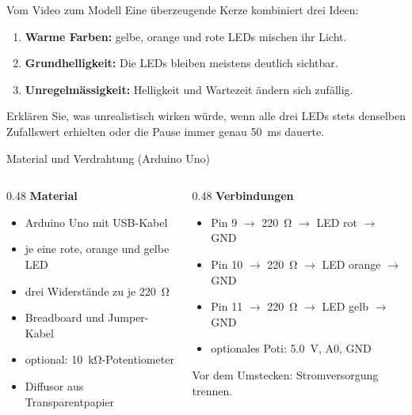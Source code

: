 \begin{frame}{Vom Video zum Modell}
	Eine überzeugende Kerze kombiniert drei Ideen:
	\begin{enumerate}[<+->]
		\item \textbf{Warme Farben:} gelbe, orange und rote LEDs mischen ihr Licht.
		\item \textbf{Grundhelligkeit:} Die LEDs bleiben meistens deutlich sichtbar.
		\item \textbf{Unregelmässigkeit:} Helligkeit und Wartezeit ändern sich zufällig.
	\end{enumerate}
	\pause
	\begin{myexercise}
		Erklären Sie, was unrealistisch wirken würde, wenn alle drei LEDs stets denselben
		Zufallswert erhielten oder die Pause immer genau \qty{50}{\milli\second} dauerte.
	\end{myexercise}
\end{frame}

\begin{frame}{Material und Verdrahtung (Arduino Uno)}
	\begin{columns}[T]
		\begin{column}{0.48\textwidth}
			\textbf{Material}
			\begin{itemize}
				\item Arduino Uno mit USB-Kabel
				\item je eine rote, orange und gelbe LED
				\item drei Widerstände zu je \qty{220}{\ohm}
				\item Breadboard und Jumper-Kabel
				\item optional: \qty{10}{\kilo\ohm}-Potentiometer
				\item Diffusor aus Transparentpapier
			\end{itemize}
		\end{column}
		\begin{column}{0.48\textwidth}
			\textbf{Verbindungen}
			\begin{itemize}
				\item Pin 9 $\rightarrow$ \qty{220}{\ohm} $\rightarrow$ LED rot $\rightarrow$ GND
				\item Pin 10 $\rightarrow$ \qty{220}{\ohm} $\rightarrow$ LED orange $\rightarrow$ GND
				\item Pin 11 $\rightarrow$ \qty{220}{\ohm} $\rightarrow$ LED gelb $\rightarrow$ GND
				\item optionales Poti: \qty{5.0}{\volt}, A0, GND
			\end{itemize}
			\alert{Vor dem Umstecken: Stromversorgung trennen.}
		\end{column}
	\end{columns}
\end{frame}

